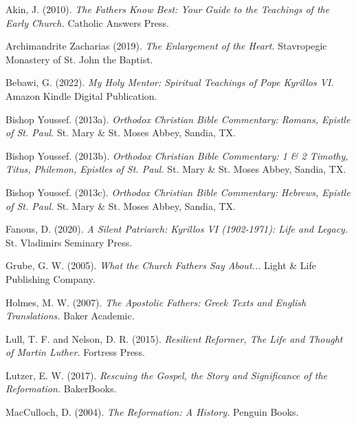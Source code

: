 \documentclass[12pt,doc]{apa7}   	%
\begin{document}
\begin{thebibliography}{15}

Akin, J. (2010). \emph{The Fathers Know Best: Your Guide to the Teachings of the Early Church.} Catholic Answers Press.
    
Archimandrite Zacharias (2019). \emph{The Enlargement of the Heart.} Stavropegic Monastery of St. John the Baptist.

Bebawi, G. (2022). \emph{My Holy Mentor: Spiritual Teachings of Pope Kyrillos VI.} Amazon Kindle Digital Publication.

Bishop Youssef. (2013a). \emph{Orthodox Christian Bible Commentary: Romans, Epistle of St. Paul.} St. Mary \& St. Moses Abbey, Sandia, TX.

Bishop Youssef. (2013b). \emph{Orthodox Christian Bible Commentary: 1 \& 2 Timothy, Titus, Philemon, Epistles of St. Paul.} St. Mary \& St. Moses Abbey, Sandia, TX.

Bishop Youssef. (2013c). \emph{Orthodox Christian Bible Commentary: Hebrews, Epistle of St. Paul.} St. Mary \& St. Moses Abbey, Sandia, TX.

Fanous, D. (2020). \emph{A Silent Patriarch: Kyrillos VI (1902-1971): Life and Legacy.} St. Vladimirs Seminary Press.

Grube, G. W. (2005). \emph{What the Church Fathers Say About...} Light \& Life Publishing Company.

Holmes, M. W. (2007). \emph{The Apostolic Fathers: Greek Texts and English Translations.} Baker Academic.

Lull, T. F. and Nelson, D. R. (2015). \emph{Resilient Reformer, The Life and Thought of Martin Luther.} Fortress Press.

Lutzer, E. W. (2017). \emph{Rescuing the Gospel, the Story and Significance of the Reformation.} BakerBooks.

MacCulloch, D. (2004). \emph{The Reformation: A History.} Penguin Books.


\end{thebibliography}
\end{document}
